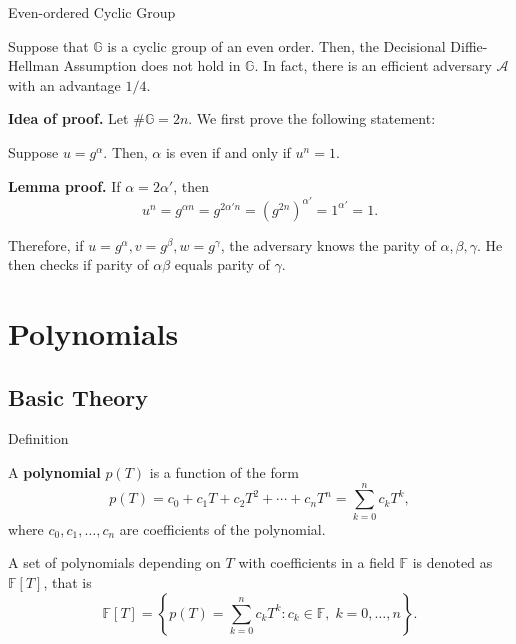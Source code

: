 \documentclass{zkdl-presentation-template}
\begin{document}
    \begin{frame}{Even-ordered Cyclic Group}
        \begin{theorem}
            Suppose that $\mathbb{G}$ is a cyclic group of an even order. Then, the Decisional Diffie-Hellman Assumption does not hold in $\mathbb{G}$. In fact, there is an efficient adversary $\mathcal{A}$ with an advantage $1/4$.
        \end{theorem}
        \pause

        \textbf{Idea of proof.} Let $\#\mathbb{G} = 2n$. We first prove the following statement:

        \begin{lemma}
            Suppose $u = g^{\alpha}$. Then, $\alpha$ is even if and only if $u^n = 1$.
        \end{lemma}
        \pause

        \textbf{Lemma proof.} If $\alpha=2\alpha'$, then
        \begin{equation*}
            u^n = g^{\alpha n} = g^{2\alpha' n} = (g^{2n})^{\alpha'} = 1^{\alpha'} = 1.
        \end{equation*}
        \vspace{-20pt}
        \pause

        Therefore, if $u = g^{\alpha}, v = g^{\beta}, w = g^{\gamma}$, the adversary knows the parity of $\alpha, \beta, \gamma$. He then checks if parity of $\alpha\beta$ equals parity of $\gamma$.
    \end{frame}

    \section{Polynomials}

    \subsection{Basic Theory}

    \begin{frame}{Definition}
      \begin{definition}
        A \textbf{polynomial} $p(T)$ is a function of the form
        \begin{equation*}
            p(T) = c_0 + c_1 T + c_2 T^2 + \cdots + c_n T^n = \sum_{k=0}^{n} c_k T^k,
        \end{equation*}
        where $c_0, c_1, \dots, c_n$ are coefficients of the polynomial.
      \end{definition}
      \pause

      \begin{definition}
        A set of polynomials depending on $T$ with coefficients in a field $\mathbb{F}$ is denoted as $\mathbb{F}[T]$, that is
        \begin{equation*}
            \mathbb{F}[T] = \left\{p(T) = \sum_{k=0}^{n} c_k T^k: c_k \in \mathbb{F}, \; k = 0,\dots,n\right\}.
        \end{equation*}
      \end{definition}
    \end{frame}
\end{document}
